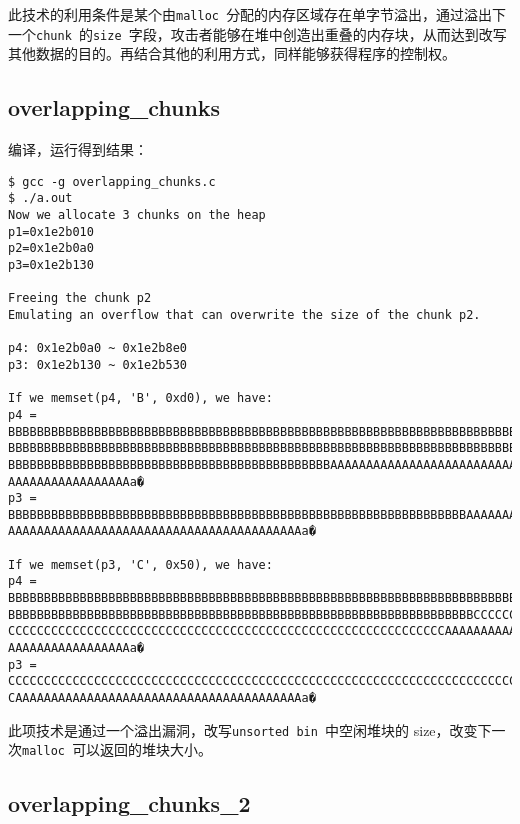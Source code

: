 此技术的利用条件是某个由\verb+malloc +分配的内存区域存在单字节溢出，通过溢出下一个\verb+chunk +的\verb+size +字段，攻击者能够在堆中创造出重叠的内存块，从而达到改写其他数据的目的。再结合其他的利用方式，同样能够获得程序的控制权。

\subsection{overlapping\_chunks}

编译，运行得到结果：
\begin{verbatim}
$ gcc -g overlapping_chunks.c
$ ./a.out 
Now we allocate 3 chunks on the heap
p1=0x1e2b010
p2=0x1e2b0a0
p3=0x1e2b130

Freeing the chunk p2
Emulating an overflow that can overwrite the size of the chunk p2.

p4: 0x1e2b0a0 ~ 0x1e2b8e0
p3: 0x1e2b130 ~ 0x1e2b530

If we memset(p4, 'B', 0xd0), we have:
p4 = BBBBBBBBBBBBBBBBBBBBBBBBBBBBBBBBBBBBBBBBBBBBBBBBBBBBBBBBBBBBBBBBBBBBBBBBBBBBBBB
BBBBBBBBBBBBBBBBBBBBBBBBBBBBBBBBBBBBBBBBBBBBBBBBBBBBBBBBBBBBBBBBBBBBBBBBBBBBBBBBBBBB
BBBBBBBBBBBBBBBBBBBBBBBBBBBBBBBBBBBBBBBBBBBBBAAAAAAAAAAAAAAAAAAAAAAAAAAAAAAAAAAAAAAA
AAAAAAAAAAAAAAAAAa�
p3 = BBBBBBBBBBBBBBBBBBBBBBBBBBBBBBBBBBBBBBBBBBBBBBBBBBBBBBBBBBBBBBBBAAAAAAAAAAAAAAA
AAAAAAAAAAAAAAAAAAAAAAAAAAAAAAAAAAAAAAAAAa�

If we memset(p3, 'C', 0x50), we have:
p4 = BBBBBBBBBBBBBBBBBBBBBBBBBBBBBBBBBBBBBBBBBBBBBBBBBBBBBBBBBBBBBBBBBBBBBBBBBBBBBBB
BBBBBBBBBBBBBBBBBBBBBBBBBBBBBBBBBBBBBBBBBBBBBBBBBBBBBBBBBBBBBBBBBCCCCCCCCCCCCCCCCCCC
CCCCCCCCCCCCCCCCCCCCCCCCCCCCCCCCCCCCCCCCCCCCCCCCCCCCCCCCCCCCCAAAAAAAAAAAAAAAAAAAAAAA
AAAAAAAAAAAAAAAAAa�
p3 = CCCCCCCCCCCCCCCCCCCCCCCCCCCCCCCCCCCCCCCCCCCCCCCCCCCCCCCCCCCCCCCCCCCCCCCCCCCCCCC
CAAAAAAAAAAAAAAAAAAAAAAAAAAAAAAAAAAAAAAAAa�
\end{verbatim}

此项技术是通过一个溢出漏洞，改写\verb+unsorted bin +中空闲堆块的 size，改变下一次\verb+malloc +可以返回的堆块大小。

\subsection{overlapping\_chunks\_2}

